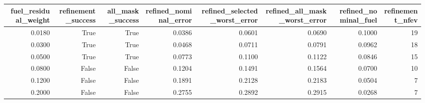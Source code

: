 \begin{tabular}{rrrrrrrr}
\toprule
fuel\_residual\_weight & refinement\_success & all\_mask\_success & refined\_nominal\_error & refined\_selected\_worst\_error & refined\_all\_mask\_worst\_error & refined\_nominal\_fuel & refinement\_nfev \\
\midrule
0.0180 & True & True & 0.0386 & 0.0601 & 0.0690 & 0.1000 & 19 \\
0.0300 & True & True & 0.0468 & 0.0711 & 0.0791 & 0.0962 & 18 \\
0.0500 & True & True & 0.0773 & 0.1100 & 0.1122 & 0.0846 & 15 \\
0.0800 & False & False & 0.1204 & 0.1491 & 0.1564 & 0.0700 & 10 \\
0.1200 & False & False & 0.1891 & 0.2128 & 0.2183 & 0.0504 & 7 \\
0.2000 & False & False & 0.2755 & 0.2892 & 0.2915 & 0.0268 & 7 \\
\bottomrule
\end{tabular}
